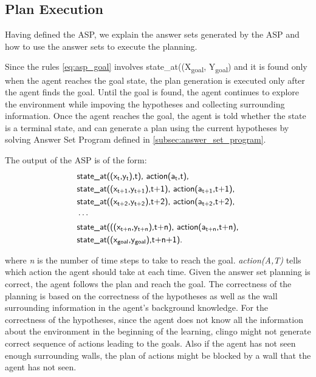 \subsection{Plan Execution}
\label{subsec:plan_execution}
Having defined the ASP, we explain the answer sets generated by the ASP and how to use the answer sets to execute the planning.

Since the rules \ref{eq:asp_goal} involves \textsf{state\_at((X\textsubscript{goal}, Y\textsubscript{goal})} and it is found only when the agent reaches the goal state, the plan generation is executed only after the agent finds the goal. 
Until the goal is found, the agent continues to explore the environment while impoving the hypotheses and collecting surrounding information.
Once the agent reaches the goal, the agent is told whether the state is a terminal state, and 
can generate a plan using the current hypotheses by solving Answer Set Program defined in \ref{subsec:answer_set_program}.

The output of the ASP is of the form:
\begin{equation}
\begin{split}
&\textsf{state\_at((x\textsubscript{t},y\textsubscript{t}),t), action(a\textsubscript{t},t),}\\
&\textsf{state\_at((x\textsubscript{t+1},y\textsubscript{t+1}),t+1), action(a\textsubscript{t+1},t+1),}\\
&\textsf{state\_at((x\textsubscript{t+2},y\textsubscript{t+2}),t+2), action(a\textsubscript{t+2},t+2),}\\
&\cdots\\
&\textsf{state\_at(((x\textsubscript{t+n},y\textsubscript{t+n}),t+n), action(a\textsubscript{t+n},t+n),}\\
&\textsf{state\_at((x\textsubscript{goal},y\textsubscript{goal}),t+n+1).} 
\end{split}
\end{equation}

where \textit{n} is the number of time steps to take to reach the goal. 
\textit{action(A,T)} tells which action the agent should take at each time.
Given the answer set planning is correct, the agent follows the plan and reach the goal. 
The correctness of the planning is based on the correctness of the hypotheses as well as the wall surrounding information in the agent's background knowledge. 
For the correctness of the hypotheses, since the agent does not know all the information about the environment in the beginning of the learning,   
clingo might not generate correct sequence of actions leading to the goals.
Also if the agent has not seen enough surrounding walls, the plan of actions might be blocked by a wall that the agent has not seen. 

